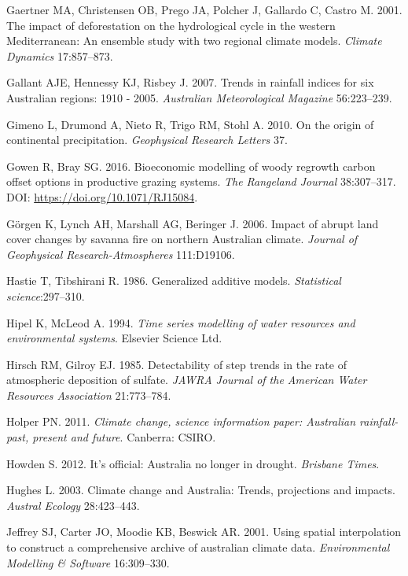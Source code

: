 \documentclass[fleqn,10pt,lineno]{wlpeerj} %
\theoremstyle{definition}
\theoremstyle{definition}
\theoremstyle{definition}
\theoremstyle{remark}
\begin{document}
\hypertarget{ref-Gaertner2001}{}
Gaertner MA, Christensen OB, Prego JA, Polcher J, Gallardo C, Castro M.
2001. The impact of deforestation on the hydrological cycle in the
western Mediterranean: An ensemble study with two regional climate
models. \emph{Climate Dynamics} 17:857--873.

\hypertarget{ref-Gallant2007}{}
Gallant AJE, Hennessy KJ, Risbey J. 2007. Trends in rainfall indices for
six Australian regions: 1910 - 2005. \emph{Australian Meteorological
Magazine} 56:223--239.

\hypertarget{ref-Gimeno2010}{}
Gimeno L, Drumond A, Nieto R, Trigo RM, Stohl A. 2010. On the origin of
continental precipitation. \emph{Geophysical Research Letters} 37.

\hypertarget{ref-Gowen2016}{}
Gowen R, Bray SG. 2016. Bioeconomic modelling of woody regrowth carbon
offset options in productive grazing systems. \emph{The Rangeland
Journal} 38:307--317. DOI:
\href{https://doi.org/https://doi.org/10.1071/RJ15084}{https://doi.org/10.1071/RJ15084}.

\hypertarget{ref-Gorgen2006}{}
Görgen K, Lynch AH, Marshall AG, Beringer J. 2006. Impact of abrupt land
cover changes by savanna fire on northern Australian climate.
\emph{Journal of Geophysical Research-Atmospheres} 111:D19106.

\hypertarget{ref-Hastie1986}{}
Hastie T, Tibshirani R. 1986. Generalized additive models.
\emph{Statistical science}:297--310.

\hypertarget{ref-Hipel1994}{}
Hipel K, McLeod A. 1994. \emph{Time series modelling of water resources
and environmental systems}. Elsevier Science Ltd.

\hypertarget{ref-Hirsch1985}{}
Hirsch RM, Gilroy EJ. 1985. Detectability of step trends in the rate of
atmospheric deposition of sulfate. \emph{JAWRA Journal of the American
Water Resources Association} 21:773--784.

\hypertarget{ref-Holper2011}{}
Holper PN. 2011. \emph{Climate change, science information paper:
Australian rainfall-past, present and future}. Canberra: CSIRO.

\hypertarget{ref-Howden2012}{}
Howden S. 2012. It's official: Australia no longer in drought.
\emph{Brisbane Times}.

\hypertarget{ref-Hughes2003}{}
Hughes L. 2003. Climate change and Australia: Trends, projections and
impacts. \emph{Austral Ecology} 28:423--443.

\hypertarget{ref-SILO2001}{}
Jeffrey SJ, Carter JO, Moodie KB, Beswick AR. 2001. Using spatial
interpolation to construct a comprehensive archive of australian climate
data. \emph{Environmental Modelling \& Software} 16:309--330.
\end{document}
